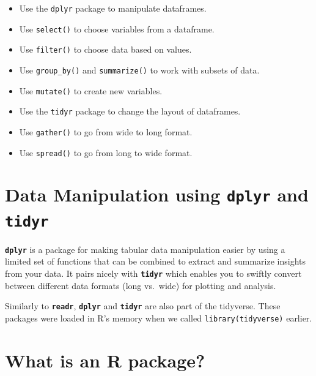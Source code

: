 \documentclass[]{book}
\providecommand{\tightlist}{%
  \setlength{\itemsep}{0pt}\setlength{\parskip}{0pt}}
\begin{document}
\begin{itemize}
\tightlist
\item
  Use the \texttt{dplyr} package to manipulate dataframes.\\
\item
  Use \texttt{select()} to choose variables from a dataframe.\\
\item
  Use \texttt{filter()} to choose data based on values.\\
\item
  Use \texttt{group\_by()} and \texttt{summarize()} to work with subsets
  of data.\\
\item
  Use \texttt{mutate()} to create new variables.\\
\item
  Use the \texttt{tidyr} package to change the layout of dataframes.\\
\item
  Use \texttt{gather()} to go from wide to long format.\\
\item
  Use \texttt{spread()} to go from long to wide format.
\end{itemize}

\section{\texorpdfstring{Data Manipulation using \textbf{\texttt{dplyr}}
and
\textbf{\texttt{tidyr}}}{Data Manipulation using dplyr and tidyr}}\label{data-manipulation-using-dplyr-and-tidyr}

\textbf{\texttt{dplyr}} is a package for making tabular data
manipulation easier by using a limited set of functions that can be
combined to extract and summarize insights from your data. It pairs
nicely with \textbf{\texttt{tidyr}} which enables you to swiftly convert
between different data formats (long vs.~wide) for plotting and
analysis.

Similarly to \textbf{\texttt{readr}}, \textbf{\texttt{dplyr}} and
\textbf{\texttt{tidyr}} are also part of the tidyverse. These packages
were loaded in R's memory when we called \texttt{library(tidyverse)}
earlier.

\section{What is an R package?}\label{what-is-an-r-package}
\end{document}
